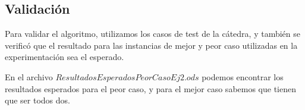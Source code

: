 \subsection{Validación}

Para validar el algoritmo, utilizamos los casos de test de la cátedra, y también se verificó que el resultado para las instancias de mejor y peor caso utilizadas en la experimentación sea el esperado.

En el archivo $ ResultadosEsperadosPeorCasoEj2.ods $ podemos encontrar los resultados esperados para el peor caso, y para el mejor caso sabemos que tienen que ser todos dos.

